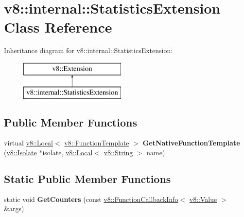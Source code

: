 \hypertarget{classv8_1_1internal_1_1_statistics_extension}{}\section{v8\+:\+:internal\+:\+:Statistics\+Extension Class Reference}
\label{classv8_1_1internal_1_1_statistics_extension}
Inheritance diagram for v8\+:\+:internal\+:\+:Statistics\+Extension\+:\begin{figure}[H]
\begin{center}
\leavevmode
\includegraphics[height=2.000000cm]{classv8_1_1internal_1_1_statistics_extension}
\end{center}
\end{figure}
\subsection*{Public Member Functions}
\begin{DoxyCompactItemize}
\item 
virtual \hyperlink{classv8_1_1_local}{v8\+::\+Local}$<$ \hyperlink{classv8_1_1_function_template}{v8\+::\+Function\+Template} $>$ {\bfseries Get\+Native\+Function\+Template} (\hyperlink{classv8_1_1_isolate}{v8\+::\+Isolate} $\ast$isolate, \hyperlink{classv8_1_1_local}{v8\+::\+Local}$<$ \hyperlink{classv8_1_1_string}{v8\+::\+String} $>$ name)\hypertarget{classv8_1_1internal_1_1_statistics_extension_a04989bf3edfcf3bb7adb0533fcfefa52}{}\label{classv8_1_1internal_1_1_statistics_extension_a04989bf3edfcf3bb7adb0533fcfefa52}

\end{DoxyCompactItemize}
\subsection*{Static Public Member Functions}
\begin{DoxyCompactItemize}
\item 
static void {\bfseries Get\+Counters} (const \hyperlink{classv8_1_1_function_callback_info}{v8\+::\+Function\+Callback\+Info}$<$ \hyperlink{classv8_1_1_value}{v8\+::\+Value} $>$ \&args)\hypertarget{classv8_1_1internal_1_1_statistics_extension_a5c931db2a7a9ec0e587f5884f1cde09f}{}\label{classv8_1_1internal_1_1_statistics_extension_a5c931db2a7a9ec0e587f5884f1cde09f}

\end{DoxyCompactItemize}
